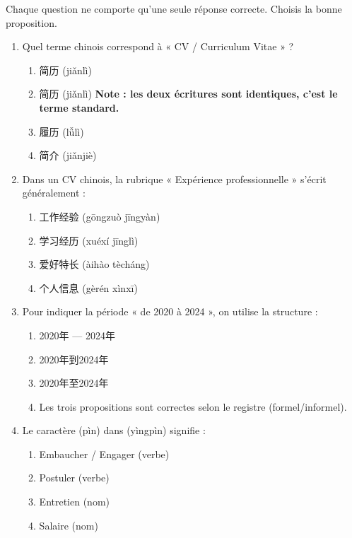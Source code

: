 \documentclass[11pt]{article}
\newcommand{\zh}[1]{\ifmmode\text{#1}\else{#1}\fi}
\begin{document}
\begin{exercice}
Chaque question ne comporte qu'une seule réponse correcte. Choisis la bonne proposition.
\begin{enumerate}
    \item Quel terme chinois correspond à « CV / Curriculum Vitae » ?
    \begin{enumerate}
        \item 简历 (jiǎnlì)
        \item 简历 (jiǎnlì) \textbf{Note : les deux écritures sont identiques, c'est le terme standard.}
        \item 履历 (lǚlì)
        \item 简介 (jiǎnjiè)
    \end{enumerate}
    \item Dans un CV chinois, la rubrique « Expérience professionnelle » s'écrit généralement :
    \begin{enumerate}
        \item 工作经验 (gōngzuò jīngyàn)
        \item 学习经历 (xuéxí jīnglì)
        \item 爱好特长 (àihào tècháng)
        \item 个人信息 (gèrén xìnxī)
    \end{enumerate}
    \item Pour indiquer la période « de 2020 à 2024 », on utilise la structure :
    \begin{enumerate}
        \item 2020年 — 2024年
        \item 2020年到2024年
        \item 2020年至2024年
        \item Les trois propositions sont correctes selon le registre (formel/informel).
    \end{enumerate}
    \item Le caractère \zh{聘} (pìn) dans \zh{应聘} (yìngpìn) signifie :
    \begin{enumerate}
        \item Embaucher / Engager (verbe)
        \item Postuler (verbe)
        \item Entretien (nom)
        \item Salaire (nom)
    \end{enumerate}
\end{enumerate}
\end{exercice}
\end{document}
